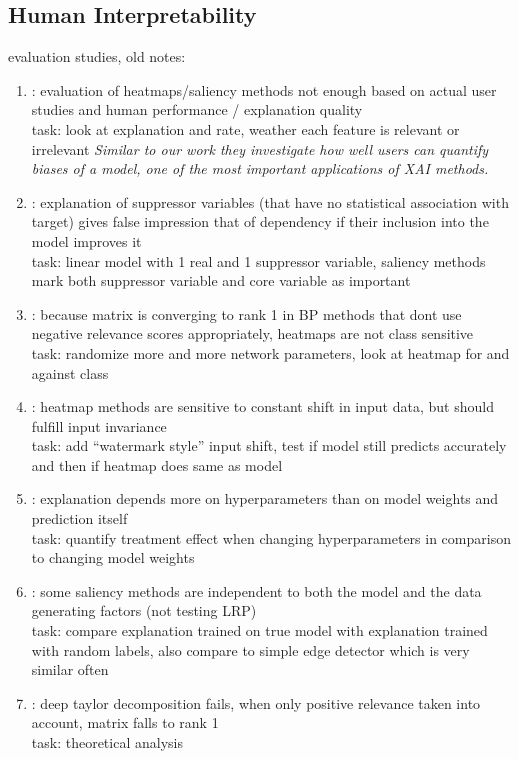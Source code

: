 \subsection{Human Interpretability}
{\color{gray} 
evaluation studies, old notes:
\begin{enumerate}
      \item \cite{Sixt2022a}: evaluation of heatmaps/saliency methods not enough based on actual user studies and human performance / explanation quality
            \\ task: look at explanation and rate, weather each feature is relevant or irrelevant
            \textit{Similar to our work they investigate how well users can quantify biases of a model, one of the most important applications of XAI methods.}
      \item \cite{Wilming2023}: explanation of suppressor variables (that have no statistical association with target) gives false impression that of dependency if their inclusion into the model improves it
            \\ task: linear model with 1 real and 1 suppressor variable, saliency methods mark both suppressor variable and core variable as important
      \item \cite{Sixt2020}: because matrix is converging to rank 1 in BP methods that dont use negative relevance scores appropriately, heatmaps are not class sensitive
            \\ task: randomize more and more network parameters, look at heatmap for and against class
      \item \cite{Kindermans2019}: heatmap methods are sensitive to constant shift in input data, but should fulfill input invariance
            \\ task: add “watermark style” input shift, test if model still predicts accurately and then if heatmap does same as model
      \item \cite{Karimi2023}: explanation depends more on hyperparameters than on model weights and prediction itself
            \\ task: quantify treatment effect when changing hyperparameters in comparison to changing model weights
      \item \cite{Adebayo2018}: some saliency methods are independent to both the model and the data generating factors (not testing LRP)
            \\ task: compare explanation trained on true model with explanation trained with random labels, also compare to simple edge detector which is very similar often
      \item \cite{Sixt2022}: deep taylor decomposition fails, when only positive relevance taken into account, matrix falls to rank 1 \\ task: theoretical analysis
\end{enumerate}
}


